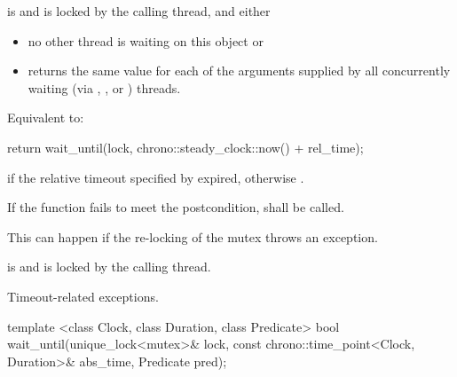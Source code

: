 \begin{itemdescr}
\pnum
\requires {} is  and 
is locked by the calling thread, and either
\begin{itemize}
\item no other thread is waiting on this  object or
\item {} returns the same value for each of the  arguments
supplied by all concurrently waiting (via , , or
) threads.
\end{itemize}

\pnum
\effects Equivalent to:
\begin{codeblock}
return wait_until(lock, chrono::steady_clock::now() + rel_time);
\end{codeblock}

\pnum
\returns {} if
the relative timeout specified by  expired,
otherwise .

\pnum
\remarks
If the function fails to meet the postcondition, 
shall be called.
\begin{note} This can happen if the re-locking of the mutex throws an exception. \end{note}

\pnum
\postconditions {} is  and 
is locked by the calling thread.

\pnum
\throws Timeout-related
exceptions.

\end{itemdescr}

%
\begin{itemdecl}
template <class Clock, class Duration, class Predicate>
  bool wait_until(unique_lock<mutex>& lock,
                  const chrono::time_point<Clock, Duration>& abs_time,
                  Predicate pred);
\end{itemdecl}

